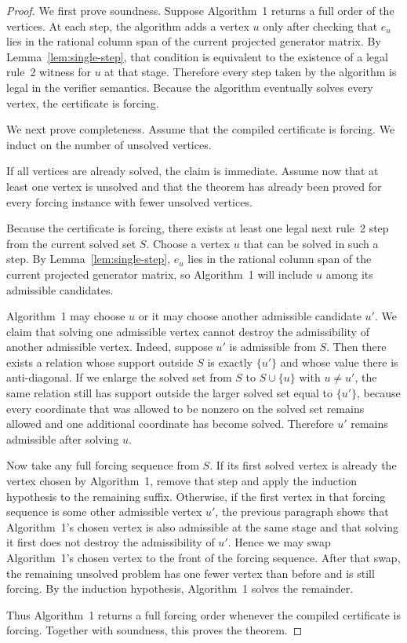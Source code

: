 \documentclass[11pt]{article}
\theoremstyle{definition}
\begin{document}
\begin{proof}
We first prove soundness. Suppose Algorithm~1 returns a full order of the vertices. At each step, the algorithm adds a vertex $u$ only after checking that $e_u$ lies in the rational column span of the current projected generator matrix. By Lemma~\ref{lem:single-step}, that condition is equivalent to the existence of a legal rule~2 witness for $u$ at that stage. Therefore every step taken by the algorithm is legal in the verifier semantics. Because the algorithm eventually solves every vertex, the certificate is forcing.

We next prove completeness. Assume that the compiled certificate is forcing. We induct on the number of unsolved vertices.

If all vertices are already solved, the claim is immediate. Assume now that at least one vertex is unsolved and that the theorem has already been proved for every forcing instance with fewer unsolved vertices.

Because the certificate is forcing, there exists at least one legal next rule~2 step from the current solved set $S$. Choose a vertex $u$ that can be solved in such a step. By Lemma~\ref{lem:single-step}, $e_u$ lies in the rational column span of the current projected generator matrix, so Algorithm~1 will include $u$ among its admissible candidates.

Algorithm~1 may choose $u$ or it may choose another admissible candidate $u'$. We claim that solving one admissible vertex cannot destroy the admissibility of another admissible vertex. Indeed, suppose $u'$ is admissible from $S$. Then there exists a relation whose support outside $S$ is exactly $\{u'\}$ and whose value there is anti-diagonal. If we enlarge the solved set from $S$ to $S\cup\{u\}$ with $u\neq u'$, the same relation still has support outside the larger solved set equal to $\{u'\}$, because every coordinate that was allowed to be nonzero on the solved set remains allowed and one additional coordinate has become solved. Therefore $u'$ remains admissible after solving $u$.

Now take any full forcing sequence from $S$. If its first solved vertex is already the vertex chosen by Algorithm~1, remove that step and apply the induction hypothesis to the remaining suffix. Otherwise, if the first vertex in that forcing sequence is some other admissible vertex $u'$, the previous paragraph shows that Algorithm~1's chosen vertex is also admissible at the same stage and that solving it first does not destroy the admissibility of $u'$. Hence we may swap Algorithm~1's chosen vertex to the front of the forcing sequence. After that swap, the remaining unsolved problem has one fewer vertex than before and is still forcing. By the induction hypothesis, Algorithm~1 solves the remainder.

Thus Algorithm~1 returns a full forcing order whenever the compiled certificate is forcing. Together with soundness, this proves the theorem.
\end{proof}
\end{document}

